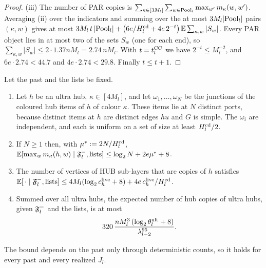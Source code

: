 \begin{proof}
(iii) The number of PAR copies is
$\sum_{\kappa\in[3M_l]}\sum_{w\in\mathrm{Pool}_l}\max_{w'}m_\kappa(w,w')$. Averaging (ii)
over the indicators and summing over the at most $3M_l|\mathrm{Pool}_l|$ pairs
$(\kappa,w)$ gives at most
$3M_l\,t\,|\mathrm{Pool}_l|+\bigl(6e/H^{\mathrm{cd}}_l+4e\,2^{-t}\bigr)\,\mathbb{E}\sum_{\kappa,w}|S_w|$.
Every PAR object lies in at most two of the sets $S_w$ (one for each end), so
$\sum_{\kappa,w}|S_w|\le2\cdot1.37nM_l=2.74\,nM_l$. With $t=t^{\mathrm{CC}}_l$ we have
$2^{-t}\le M_l^{-2}$, and $6e\cdot2.74<44.7$ and $4e\cdot2.74<29.8$. Finally
$t\le t+1$.
\end{proof}

\begin{lemma}\label{s7:lemUltra}
Let the past and the lists be fixed.
\begin{enumerate}
\item[(i)] Let $h$ be an ultra hub, $\kappa\in[4M_l]$, and let
$\omega_1,\dots,\omega_N$ be the junctions of the coloured hub items of $h$ of
colour $\kappa$. These items lie at $N$ distinct ports, because distinct items
at $h$ are distinct edges $hu$ and $G$ is simple. The $\omega_i$ are independent,
and each is uniform on a set of size at least $H^{\mathrm{cd}}_l/2$.
\item[(ii)] If $N\ge1$ then, with $\mu^*\mathrel{:=}2N/H^{\mathrm{cd}}_l$,
$\mathbb{E}[\max_w m_\kappa(h,w)\mid\mathfrak{F}^{-}_l,\text{lists}]\le\log_2N+2e\mu^*+8$.
\item[(iii)] The number of vertices of HUB sub-layers that are copies of $h$
satisfies
$\mathbb{E}[\,\cdot\mid\mathfrak{F}^{-}_l,\text{lists}]\le4M_l(\log_2c^{\mathrm{live}}_h+8)+4e\,c^{\mathrm{live}}_h/H^{\mathrm{cd}}_l$.
\item[(iv)] Summed over all ultra hubs, the expected number of hub copies of
ultra hubs, given $\mathfrak{F}^{-}_l$ and the lists, is at most
\[
320\,\frac{nM_l^{3}\,(\log_2\theta^{\mathrm{ult}}_l+8)}{\lambda_{l-2}^{95}} .
\]
\end{enumerate}
The bound depends on the past only through deterministic counts, so it holds for
every past and every realized $J_l$.
\deps{\ref{s7:consRound}, \ref{s7:lemWellDef}, \ref{s6:lemJplus}, \ref{s1:citChernoffGen}, \ref{s7:lemMULT}, \ref{s7:lemCand}}
\end{lemma}

